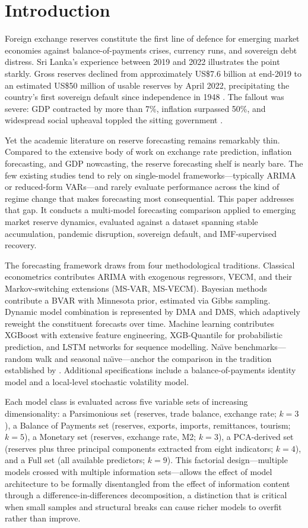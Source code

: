 \documentclass[12pt,a4paper]{article}
\begin{document}
\section{Introduction}

Foreign exchange reserves constitute the first line of defence for emerging market economies against balance-of-payments crises, currency runs, and sovereign debt distress. Sri Lanka's experience between 2019 and 2022 illustrates the point starkly. Gross reserves declined from approximately US\$7.6 billion at end-2019 to an estimated US\$50 million of usable reserves by April 2022, precipitating the country's first sovereign default since independence in 1948 \citep{Athukorala2024,Wignaraja2024}. The fallout was severe: GDP contracted by more than 7\%, inflation surpassed 50\%, and widespread social upheaval toppled the sitting government \citep{Weerakoon2023}.

Yet the academic literature on reserve forecasting remains remarkably thin. Compared to the extensive body of work on exchange rate prediction, inflation forecasting, and GDP nowcasting, the reserve forecasting shelf is nearly bare. The few existing studies tend to rely on single-model frameworks---typically ARIMA or reduced-form VARs---and rarely evaluate performance across the kind of regime change that makes forecasting most consequential. This paper addresses that gap. It conducts a multi-model forecasting comparison applied to emerging market reserve dynamics, evaluated against a dataset spanning stable accumulation, pandemic disruption, sovereign default, and IMF-supervised recovery.

The forecasting framework draws from four methodological traditions. Classical econometrics contributes ARIMA with exogenous regressors, VECM, and their Markov-switching extensions (MS-VAR, MS-VECM). Bayesian methods contribute a BVAR with Minnesota prior, estimated via Gibbs sampling. Dynamic model combination is represented by DMA and DMS, which adaptively reweight the constituent forecasts over time. Machine learning contributes XGBoost with extensive feature engineering, XGB-Quantile for probabilistic prediction, and LSTM networks for sequence modelling. Na\"{\i}ve benchmarks---random walk and seasonal na\"{\i}ve---anchor the comparison in the tradition established by \cite{MeeseRogoff1983}. Additional specifications include a balance-of-payments identity model and a local-level stochastic volatility model.

Each model class is evaluated across five variable sets of increasing dimensionality: a Parsimonious set (reserves, trade balance, exchange rate; $k=3$), a Balance of Payments set (reserves, exports, imports, remittances, tourism; $k=5$), a Monetary set (reserves, exchange rate, M2; $k=3$), a PCA-derived set (reserves plus three principal components extracted from eight indicators; $k=4$), and a Full set (all available predictors; $k=9$). This factorial design---multiple models crossed with multiple information sets---allows the effect of model architecture to be formally disentangled from the effect of information content through a difference-in-differences decomposition, a distinction that is critical when small samples and structural breaks can cause richer models to overfit rather than improve.
\end{document}
